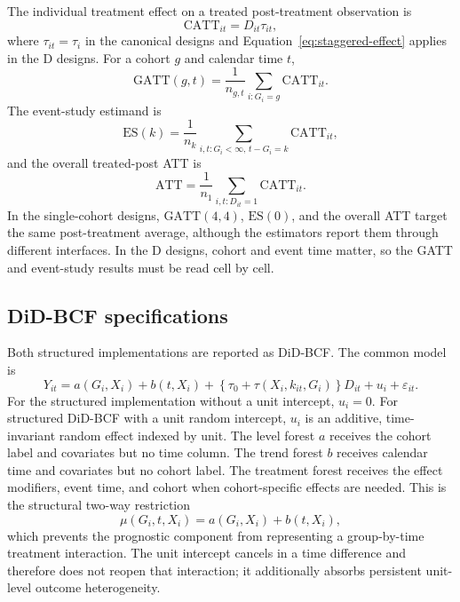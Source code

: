 \documentclass[11pt]{article}
\newcommand{\att}{\mathrm{ATT}}
\newcommand{\gatt}{\mathrm{GATT}}
\newcommand{\es}{\mathrm{ES}}
\newcommand{\catt}{\mathrm{CATT}}
\begin{document}
The individual treatment effect on a treated post-treatment observation is
\begin{equation}
 \catt_{it}=D_{it}\tau_{it},
 \label{eq:catt}
\end{equation}
where $\tau_{it}=\tau_i$ in the canonical designs and
Equation~\eqref{eq:staggered-effect} applies in the D designs. For a cohort $g$
and calendar time $t$,
\begin{equation}
 \gatt(g,t)=\frac{1}{n_{g,t}}
 \sum_{i:G_i=g}\catt_{it}.
 \label{eq:gatt}
\end{equation}
The event-study estimand is
\begin{equation}
 \es(k)=\frac{1}{n_k}
 \sum_{i,t:G_i<\infty,\,t-G_i=k}\catt_{it},
 \label{eq:event-study}
\end{equation}
and the overall treated-post ATT is
\begin{equation}
 \att=\frac{1}{n_1}\sum_{i,t:D_{it}=1}\catt_{it}.
 \label{eq:att}
\end{equation}
In the single-cohort designs, $\gatt(4,4)$, $\es(0)$, and the overall ATT
target the same post-treatment average, although the estimators report them
through different interfaces. In the D designs, cohort and event time matter,
so the GATT and event-study results must be read cell by cell.

\subsection{DiD-BCF specifications}

Both structured implementations are reported as DiD-BCF. The common model is
\begin{equation}
 Y_{it}=a(G_i,X_i)+b(t,X_i)
 +\left\{\tau_0+\tau(X_i,k_{it},G_i)\right\}D_{it}+u_i+\varepsilon_{it}.
 \label{eq:structured-model}
\end{equation}
For the structured implementation without a unit intercept, $u_i=0$. For
structured DiD-BCF with a unit random intercept, $u_i$ is an additive,
time-invariant random effect indexed by unit. The level forest $a$ receives
the cohort label and covariates but no time column. The trend forest $b$
receives calendar time and covariates but no cohort label. The treatment forest
receives the effect modifiers, event time, and cohort when cohort-specific
effects are needed. This is the structural two-way restriction
\begin{equation}
 \mu(G_i,t,X_i)=a(G_i,X_i)+b(t,X_i),
 \label{eq:two-way}
\end{equation}
which prevents the prognostic component from representing a group-by-time
treatment interaction. The unit intercept cancels in a time difference and
therefore does not reopen that interaction; it additionally absorbs persistent
unit-level outcome heterogeneity.
\end{document}
